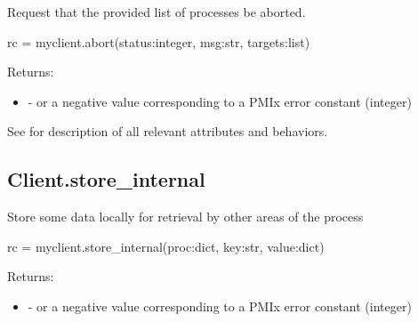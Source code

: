 Request that the provided list of processes be aborted.

\format

\pyspecificstart
\begin{codepar}
rc = myclient.abort(status:integer, msg:str, targets:list)
\end{codepar}
\pyspecificend

\begin{arglist}
\end{arglist}

Returns:

\begin{itemize}
    \item {} -  or a negative value corresponding to a PMIx error constant (integer)
\end{itemize}

See  for description of all relevant attributes and behaviors.


\subsection{Client.store_internal}

\summary

Store some data locally for retrieval by other areas of the process

\format

\pyspecificstart
\begin{codepar}
rc = myclient.store_internal(proc:dict, key:str, value:dict)
\end{codepar}
\pyspecificend

\begin{arglist}
\end{arglist}

Returns:

\begin{itemize}
    \item {} -  or a negative value corresponding to a PMIx error constant (integer)
\end{itemize}

